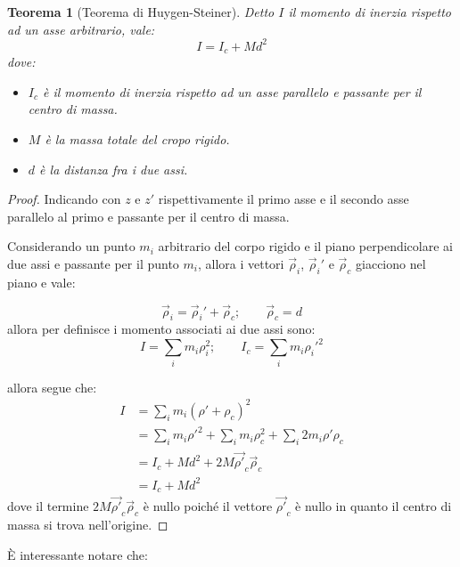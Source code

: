 \documentclass[11pt, a4paper, openright]{book}
\theoremstyle{plain}
\newtheorem{theorem}{Teorema}[section]
\theoremstyle{definition}
\begin{document}
\begin{theorem}[Teorema di Huygen-Steiner]
    Detto $I$ il momento di inerzia rispetto ad un asse arbitrario, vale:
    \begin{equation}
        I = I_c + Md^2
    \end{equation}
    dove:
    \begin{itemize}
        \item $I_c$ è il momento di inerzia rispetto ad un asse parallelo e passante per il centro di massa.
        \item $M$ è la massa totale del cropo rigido.
        \item $d$ è la distanza fra i due assi.
    \end{itemize}
\end{theorem}
\begin{proof}
    Indicando con $z$ e $z'$ rispettivamente il primo asse e il secondo asse parallelo al primo e passante per il centro di massa.
    
    Considerando un punto $m_i$ arbitrario del corpo rigido e il piano perpendicolare ai due assi e passante per il punto $m_i$, allora i vettori $\vec{\rho}_i$, $\vec{\rho}_i'$ e $\vec{\rho}_c$ giacciono nel piano e vale:

    \begin{equation}
        \vec{\rho}_i = \vec{\rho}_i' + \vec{\rho}_c; \quad \quad \vec{\rho}_c = d
    \end{equation}
    allora per definisce i momento associati ai due assi sono:
    \begin{equation}
        I = \sum_i m_i \rho_i^2; \quad \quad I_c = \sum_i m_i \rho_i'^2
    \end{equation}

    allora segue che:
    \begin{align}
        I & = \sum_i m_i (\rho' + \rho_c)^2 \\
        & = \sum_i m_i \rho'^2 + \sum_i m_i \rho_c^2 + \sum_i 2m_i \rho'\rho_c \\
        & = I_c + Md^2 + 2M \vec{\rho'}_c \vec{\rho}_c \\
        & = I_c + Md^2
    \end{align}
    dove il termine $2M \vec{\rho'}_c \vec{\rho}_c$ è nullo poiché il vettore $\vec{\rho'}_c$ è nullo in quanto il centro di massa si trova nell'origine.
\end{proof}
È interessante notare che:
\end{document}
